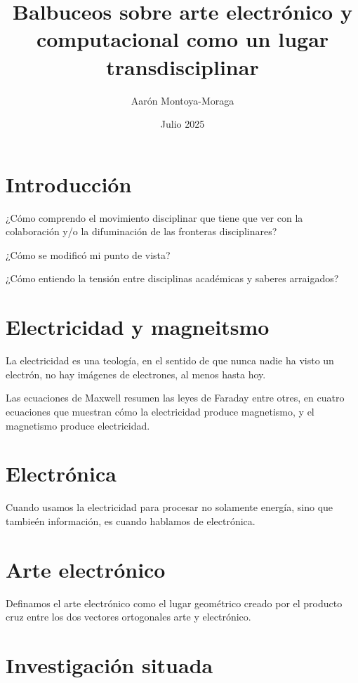 \documentclass{article}
\title{Balbuceos sobre arte electrónico y computacional como un lugar transdisciplinar}
\author{Aarón Montoya-Moraga}
\date{Julio 2025}
\begin{document}
\maketitle

\renewcommand*\contentsname{Tabla de contenidos}

\tableofcontents

\section{Introducción}

¿Cómo comprendo el movimiento disciplinar que tiene que ver con la colaboración y/o la difuminación de las fronteras disciplinares?

¿Cómo se modificó mi punto de vista?

¿Cómo entiendo la tensión entre disciplinas académicas y saberes arraigados?

\section{Electricidad y magneitsmo}

La electricidad es una teología, en el sentido de que nunca nadie ha visto un electrón, no hay imágenes de electrones, al menos hasta hoy.

Las ecuaciones de Maxwell resumen las leyes de Faraday entre otres, en cuatro ecuaciones que muestran cómo la electricidad produce magnetismo, y el magnetismo produce electricidad.

\section{Electrónica}

Cuando usamos la electricidad para procesar no solamente energía, sino que tambieén información, es cuando hablamos de electrónica.

\section{Arte electrónico}

Definamos el arte electrónico como el lugar geométrico creado por el producto cruz entre los dos vectores ortogonales arte y electrónico.

\section{Investigación situada}
\end{document}
